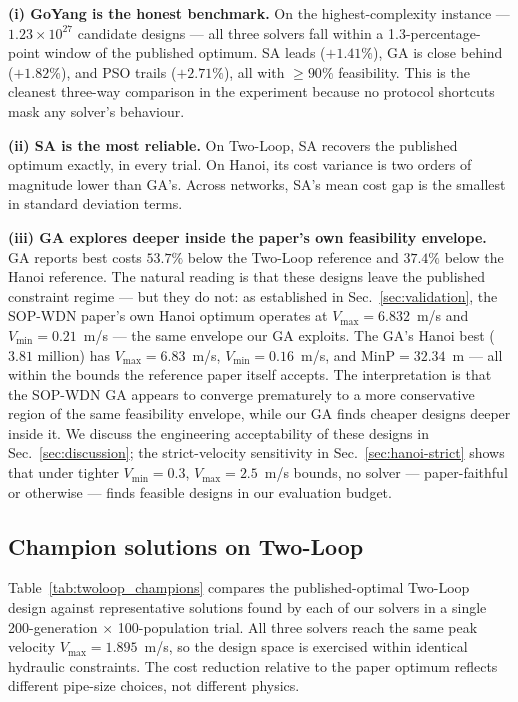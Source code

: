 \documentclass[conference]{IEEEtran}
\begin{document}
\textbf{(i) GoYang is the honest benchmark.} On the highest-complexity instance --- $1.23\!\times\!10^{27}$ candidate designs --- all three solvers fall within a 1.3-percentage-point window of the published optimum. SA leads (\(+1.41\%\)), GA is close behind (\(+1.82\%\)), and PSO trails (\(+2.71\%\)), all with $\geq90\%$ feasibility. This is the cleanest three-way comparison in the experiment because no protocol shortcuts mask any solver's behaviour.

\textbf{(ii) SA is the most reliable.} On Two-Loop, SA recovers the published optimum exactly, in every trial. On Hanoi, its cost variance is two orders of magnitude lower than GA's. Across networks, SA's mean cost gap is the smallest in standard deviation terms.

\textbf{(iii) GA explores deeper inside the paper's own feasibility envelope.} GA reports best costs $53.7\%$ below the Two-Loop reference and $37.4\%$ below the Hanoi reference. The natural reading is that these designs leave the published constraint regime --- but they do not: as established in Sec.~\ref{sec:validation}, the SOP-WDN paper's own Hanoi optimum operates at $V_{\max}=6.832$~m/s and $V_{\min}=0.21$~m/s --- the same envelope our GA exploits. The GA's Hanoi best ($3.81$ million) has $V_{\max}=6.83$~m/s, $V_{\min}=0.16$~m/s, and $\text{MinP}=32.34$~m --- all within the bounds the reference paper itself accepts. The interpretation is that the SOP-WDN GA appears to converge prematurely to a more conservative region of the same feasibility envelope, while our GA finds cheaper designs deeper inside it. We discuss the engineering acceptability of these designs in Sec.~\ref{sec:discussion}; the strict-velocity sensitivity in Sec.~\ref{sec:hanoi-strict} shows that under tighter $V_{\min}=0.3$, $V_{\max}=2.5$~m/s bounds, no solver --- paper-faithful or otherwise --- finds feasible designs in our evaluation budget.

\subsection{Champion solutions on Two-Loop}
\label{sec:champions}
Table~\ref{tab:twoloop_champions} compares the published-optimal Two-Loop design against representative solutions found by each of our solvers in a single 200-generation $\times$ 100-population trial. All three solvers reach the same peak velocity $V_{\max}=1.895$~m/s, so the design space is exercised within identical hydraulic constraints. The cost reduction relative to the paper optimum reflects different pipe-size choices, not different physics.
\end{document}
